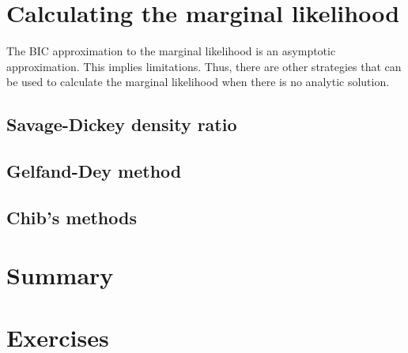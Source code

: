 \section{Calculating the marginal likelihood}\label{sec10_6}

The BIC approximation to the marginal likelihood is an asymptotic approximation. This implies limitations. Thus, there are other strategies that can be used to calculate the marginal likelihood when there is no analytic solution.

\subsection{Savage-Dickey density ratio}\label{sec10_11}

\subsection{Gelfand-Dey method}\label{sec10_12}

\subsection{Chib's methods}\label{sec10_13}

\section{Summary}\label{sec10_7}

\section{Exercises}\label{sec10_8}


